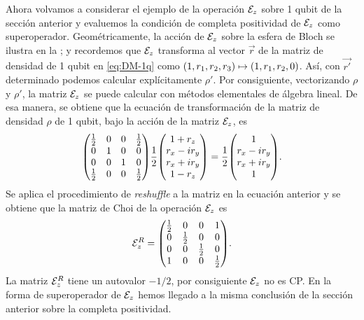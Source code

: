 Ahora volvamos a considerar el ejemplo de la operación $\mathcal{E}_z$ 
sobre 1 qubit de la sección anterior y evaluemos la condición de 
completa positividad de $\mathcal{E}_z$ como superoperador. 
Geométricamente, la acción de $\mathcal{E}_z$ sobre la 
esfera de Bloch se ilustra en la ;
y recordemos que $\mathcal{E}_z$ transforma al vector $\vec{r}$ 
de la matriz de densidad de 1 qubit en \eqref{eq:DM-1q} 
como $\qty(1,r_1,r_2,r_3)\mapsto\qty(1,r_1,r_2,0)$. Así, 
con $\vec{r'}$ determinado podemos calcular 
explícitamente $\rho'$.
Por consiguiente, vectorizando $\rho$ y $\rho'$, la matriz $\mathcal{E}_z$ 
se puede calcular con métodos elementales de álgebra lineal. 
De esa manera, se obtiene que la ecuación de transformación 
de la matriz de densidad $\rho$ de 1 qubit, bajo la
acción de la matriz $\mathcal{E}_z$, es
\begin{align}
\mqty(
\frac{1}{2} & 0 & 0 & \frac{1}{2} \\
0 & 1 & 0 & 0 \\
0 & 0 & 1 & 0 \\
\frac{1}{2} & 0 & 0 & \frac{1}{2} \\
)
\frac{1}{2}
\mqty(
1+r_z\\r_x-ir_y\\r_x+ir_y\\1-r_z
)
=
\frac{1}{2}
\mqty(
1\\r_x-ir_y\\r_x+ir_y\\1
).
\end{align}
Se aplica el procedimiento de \textit{reshuffle} a la matriz en la ecuación 
anterior y se obtiene que la matriz de Choi de la operación $\mathcal{E}_z$ es
\begin{align}
\E_z^R=
\mqty(
\frac{1}{2} & 0 & 0 & 1 \\
0 & \frac{1}{2} & 0 & 0 \\
0 & 0 & \frac{1}{2} & 0 \\
1 & 0 & 0 & \frac{1}{2} 
).
\end{align}
La matriz $\mathcal{E}_z^R$ tiene un autovalor $-1/2$, 
por consiguiente $\mathcal{E}_z$ no es CP. 
En la forma de superoperador de $\mathcal{E}_z$ hemos llegado a la misma
conclusión de la sección anterior sobre la 
completa positividad.

